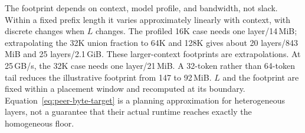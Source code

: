 The footprint depends on context, model profile, and bandwidth, not slack.
Within a fixed prefix length it varies approximately linearly with
context, with discrete changes when $L$ changes. The profiled 16K case
needs one layer/14\,MiB; extrapolating the 32K union fraction to 64K and
128K gives about 20 layers/843\,MiB and 25 layers/2.1\,GiB.
These larger-context footprints are extrapolations. At 25\,GB/s,
the 32K case needs one layer/21\,MiB. A 32-token rather than 64-token
tail reduces the illustrative footprint from 147 to 92\,MiB.
$L$ and the footprint are fixed within a placement window and recomputed
at its boundary. Equation~\ref{eq:peer-byte-target} is a planning
approximation for heterogeneous layers, not a guarantee that their
actual runtime reaches exactly the homogeneous floor.
